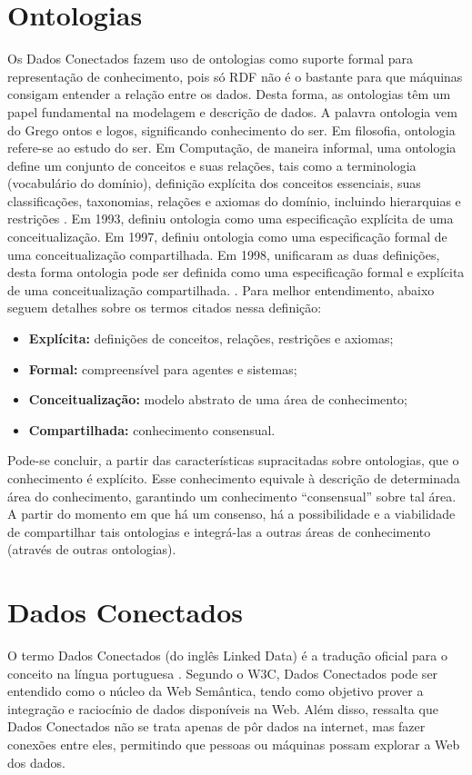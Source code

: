 \section{Ontologias}
Os Dados Conectados fazem uso de ontologias como suporte formal para representação de conhecimento, pois só RDF não é o bastante para que máquinas consigam entender a relação entre os dados. Desta forma, as ontologias têm um papel fundamental na modelagem e descrição de dados. A palavra ontologia vem do Grego ontos e logos, significando conhecimento do ser. Em filosofia, ontologia refere-se ao estudo do ser. Em Computação, de maneira informal, uma ontologia define um conjunto de conceitos e suas relações, tais como a terminologia (vocabulário do domínio), definição explícita dos conceitos essenciais, suas classificações, taxonomias, relações e axiomas do domínio, incluindo hierarquias e restrições \cite{deved2006semantic}. Em 1993, \citeauthor{gruber1993translation} definiu ontologia como uma especificação explícita de uma conceitualização. Em 1997, \citeauthor{borstw1997construction} definiu ontologia como uma especificação formal de uma conceitualização compartilhada. Em 1998, \citeauthor{studer1998knowledge} unificaram as duas definições, desta forma ontologia pode ser definida como uma especificação formal e explícita de uma conceitualização compartilhada.
. Para melhor entendimento, abaixo seguem detalhes sobre os termos citados nessa definição: 
\begin{itemize}
	\item \textbf{Explícita:} definições de conceitos, relações, restrições e axiomas; 
	\item \textbf{Formal:} compreensível para agentes e sistemas; 
	\item \textbf{Conceitualização:} modelo abstrato de uma área de conhecimento; 
	\item \textbf{Compartilhada:} conhecimento consensual. 
\end{itemize}
Pode-se concluir, a partir das características supracitadas sobre ontologias, que o conhecimento é explícito. Esse conhecimento equivale à descrição de determinada área do conhecimento, garantindo um conhecimento “consensual” sobre tal área. A partir do momento em que há um consenso, há a possibilidade e a viabilidade de compartilhar tais ontologias e integrá-las a outras áreas de conhecimento (através de outras ontologias).

\section{Dados Conectados}
O termo Dados Conectados (do inglês Linked Data) é a tradução oficial para o conceito na língua portuguesa \cite{Isotani2015}. Segundo o W3C, Dados Conectados pode ser entendido como o núcleo da Web Semântica, tendo como objetivo prover a integração e raciocínio de dados disponíveis na Web. Além disso,  ressalta que Dados Conectados não se trata apenas de pôr dados na internet, mas fazer conexões entre eles, permitindo que pessoas ou máquinas possam explorar a Web dos dados.

